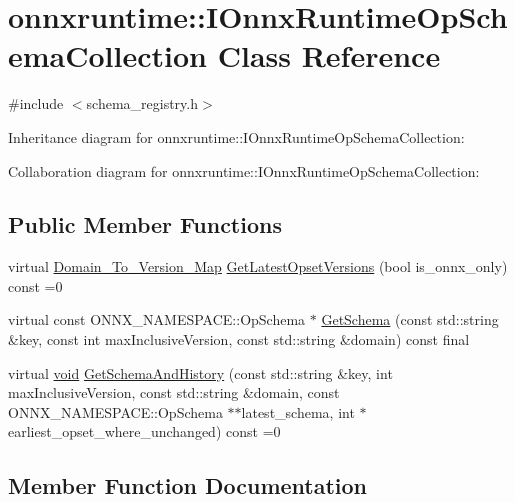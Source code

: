\hypertarget{classonnxruntime_1_1IOnnxRuntimeOpSchemaCollection}{}\section{onnxruntime\+:\+:I\+Onnx\+Runtime\+Op\+Schema\+Collection Class Reference}
\label{classonnxruntime_1_1IOnnxRuntimeOpSchemaCollection}


{\ttfamily \#include $<$schema\+\_\+registry.\+h$>$}



Inheritance diagram for onnxruntime\+:\+:I\+Onnx\+Runtime\+Op\+Schema\+Collection\+:


Collaboration diagram for onnxruntime\+:\+:I\+Onnx\+Runtime\+Op\+Schema\+Collection\+:
\subsection*{Public Member Functions}
\begin{DoxyCompactItemize}
\item 
virtual \mbox{\hyperlink{namespaceonnxruntime_ab773a024322804641f5eb4964e3471d6}{Domain\+\_\+\+To\+\_\+\+Version\+\_\+\+Map}} \mbox{\hyperlink{classonnxruntime_1_1IOnnxRuntimeOpSchemaCollection_aba4c47f6650781c1ad22d6e61d09b729}{Get\+Latest\+Opset\+Versions}} (bool is\+\_\+onnx\+\_\+only) const =0
\item 
virtual const O\+N\+N\+X\+\_\+\+N\+A\+M\+E\+S\+P\+A\+C\+E\+::\+Op\+Schema $\ast$ \mbox{\hyperlink{classonnxruntime_1_1IOnnxRuntimeOpSchemaCollection_aebb95e90aa451584b39a50d07f87839f}{Get\+Schema}} (const std\+::string \&key, const int max\+Inclusive\+Version, const std\+::string \&domain) const final
\item 
virtual \mbox{\hyperlink{mlasi_8h_a88f941d423cb2a819b70a1358982b1a6}{void}} \mbox{\hyperlink{classonnxruntime_1_1IOnnxRuntimeOpSchemaCollection_a9ac69a75ece4f75b614e6b352f8501f0}{Get\+Schema\+And\+History}} (const std\+::string \&key, int max\+Inclusive\+Version, const std\+::string \&domain, const O\+N\+N\+X\+\_\+\+N\+A\+M\+E\+S\+P\+A\+C\+E\+::\+Op\+Schema $\ast$$\ast$latest\+\_\+schema, int $\ast$earliest\+\_\+opset\+\_\+where\+\_\+unchanged) const =0
\end{DoxyCompactItemize}


\subsection{Member Function Documentation}
\mbox{\label{classonnxruntime_1_1IOnnxRuntimeOpSchemaCollection_aba4c47f6650781c1ad22d6e61d09b729}} 
